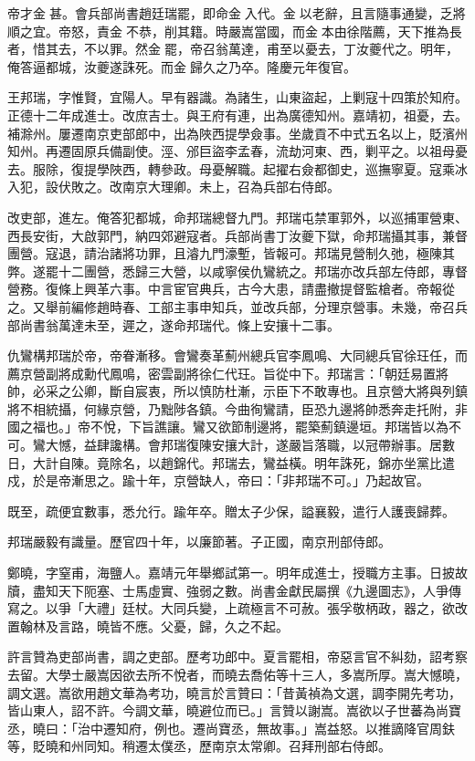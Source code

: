 \begin{pinyinscope}
帝才金甚。會兵部尚書趙廷瑞罷，即命金入代。金以老辭，且言隨事通變，乏將順之宜。帝怒，責金不恭，削其籍。時嚴嵩當國，而金本由徐階薦，天下推為長者，惜其去，不以罪。然金罷，帝召翁萬達，甫至以憂去，丁汝夔代之。明年，俺答逼都城，汝夔遂誅死。而金歸久之乃卒。隆慶元年復官。

王邦瑞，字惟賢，宜陽人。早有器識。為諸生，山東盜起，上剿寇十四策於知府。正德十二年成進士。改庶吉士。與王府有連，出為廣德知州。嘉靖初，祖憂，去。補滁州。屢遷南京吏部郎中，出為陜西提學僉事。坐歲貢不中式五名以上，貶濱州知州。再遷固原兵備副使。涇、邠巨盜李孟春，流劫河東、西，剿平之。以祖母憂去。服除，復提學陜西，轉參政。母憂解職。起擢右僉都御史，巡撫寧夏。寇乘冰入犯，設伏敗之。改南京大理卿。未上，召為兵部右侍郎。

改吏部，進左。俺答犯都城，命邦瑞總督九門。邦瑞屯禁軍郭外，以巡捕軍營東、西長安街，大啟郭門，納四郊避寇者。兵部尚書丁汝夔下獄，命邦瑞攝其事，兼督團營。寇退，請治諸將功罪，且濬九門濠塹，皆報可。邦瑞見營制久弛，極陳其弊。遂罷十二團營，悉歸三大營，以咸寧侯仇鸞統之。邦瑞亦改兵部左侍郎，專督營務。復條上興革六事。中言宦官典兵，古今大患，請盡撤提督監槍者。帝報從之。又舉前編修趙時春、工部主事申知兵，並改兵部，分理京營事。未幾，帝召兵部尚書翁萬達未至，遲之，遂命邦瑞代。條上安攘十二事。

仇鸞構邦瑞於帝，帝眷漸移。會鸞奏革薊州總兵官李鳳鳴、大同總兵官徐玨任，而薦京營副將成勳代鳳鳴，密雲副將徐仁代玨。旨從中下。邦瑞言：「朝廷易置將帥，必采之公卿，斷自宸衷，所以慎防杜漸，示臣下不敢專也。且京營大將與列鎮將不相統攝，何緣京營，乃黜陟各鎮。今曲徇鸞請，臣恐九邊將帥悉奔走托附，非國之福也。」帝不悅，下旨譙讓。鸞又欲節制邊將，罷築薊鎮邊垣。邦瑞皆以為不可。鸞大憾，益肆讒構。會邦瑞復陳安攘大計，遂嚴旨落職，以冠帶辦事。居數日，大計自陳。竟除名，以趙錦代。邦瑞去，鸞益橫。明年誅死，錦亦坐黨比遣戍，於是帝漸思之。踰十年，京營缺人，帝曰：「非邦瑞不可。」乃起故官。

既至，疏便宜數事，悉允行。踰年卒。贈太子少保，謚襄毅，遣行人護喪歸葬。

邦瑞嚴毅有識量。歷官四十年，以廉節著。子正國，南京刑部侍郎。

鄭曉，字窒甫，海鹽人。嘉靖元年舉鄉試第一。明年成進士，授職方主事。日披故牘，盡知天下阨塞、士馬虛實、強弱之數。尚書金獻民屬撰《九邊圖志》，人爭傳寫之。以爭「大禮」廷杖。大同兵變，上疏極言不可赦。張孚敬柄政，器之，欲改置翰林及言路，曉皆不應。父憂，歸，久之不起。

許言贊為吏部尚書，調之吏部。歷考功郎中。夏言罷相，帝惡言官不糾劾，詔考察去留。大學士嚴嵩因欲去所不悅者，而曉去喬佑等十三人，多嵩所厚。嵩大憾曉，調文選。嵩欲用趙文華為考功，曉言於言贊曰：「昔黃禎為文選，調李開先考功，皆山東人，詔不許。今調文華，曉避位而已。」言贊以謝嵩。嵩欲以子世蕃為尚寶丞，曉曰：「治中遷知府，例也。遷尚寶丞，無故事。」嵩益怒。以推謫降官周鈇等，貶曉和州同知。稍遷太僕丞，歷南京太常卿。召拜刑部右侍郎。


\end{pinyinscope}
